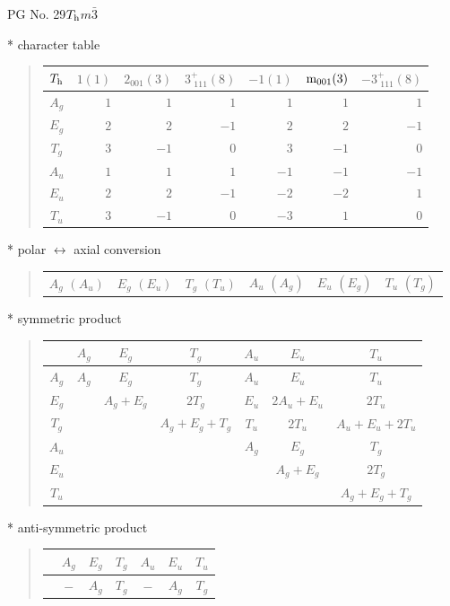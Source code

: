 \documentclass[fleqn,8pt,landscape]{jsarticle}
\begin{document}
\setcounter{MaxMatrixCols}{32}

\renewcommand{\tablename}{Table~}
\renewcommand{\figurename}{Figure~}
\begin{center}
\LARGE
PG No. 29\quad$T_{\rm h}$\quad$m\bar{3}$\quad[ cubic ]
\end{center}

* character table
\begin{quote}
\begin{tabular}{crrrrrr} \hline \hline
$ T_{\rm h} $ & $ 1(1) $ & $ 2{}_{001}(3) $ & $ 3^{+}_{\,\,111}(8) $ & $ -1(1) $ & $ {\rm m}_{001}(3) $ & $ -3^{+}_{\,\,111}(8) $ \\ \hline
$ A_{g} $ & $ 1 $ & $ 1 $ & $ 1 $ & $ 1 $ & $ 1 $ & $ 1 $ \\
$ E_{g} $ & $ 2 $ & $ 2 $ & $ -1 $ & $ 2 $ & $ 2 $ & $ -1 $ \\
$ T_{g} $ & $ 3 $ & $ -1 $ & $ 0 $ & $ 3 $ & $ -1 $ & $ 0 $ \\
$ A_{u} $ & $ 1 $ & $ 1 $ & $ 1 $ & $ -1 $ & $ -1 $ & $ -1 $ \\
$ E_{u} $ & $ 2 $ & $ 2 $ & $ -1 $ & $ -2 $ & $ -2 $ & $ 1 $ \\
$ T_{u} $ & $ 3 $ & $ -1 $ & $ 0 $ & $ -3 $ & $ 1 $ & $ 0 $ \\
 \hline \hline
\end{tabular}
\end{quote}

* polar $\leftrightarrow$ axial conversion
\begin{quote}
\begin{tabular}{cccccc}
$ A_{g}\,\,(A_{u}) $ & $ E_{g}\,\,(E_{u}) $ & $ T_{g}\,\,(T_{u}) $ & $ A_{u}\,\,(A_{g}) $ & $ E_{u}\,\,(E_{g}) $ & $ T_{u}\,\,(T_{g}) $
\end{tabular}
\end{quote}

* symmetric product
\begin{quote}
\begin{tabular}{c|cccccc} \hline \hline
 & $ A_{g} $ & $ E_{g} $ & $ T_{g} $ & $ A_{u} $ & $ E_{u} $ & $ T_{u} $ \\ \hline
$ A_{g} $ & $ A_{g} $ & $ E_{g} $ & $ T_{g} $ & $ A_{u} $ & $ E_{u} $ & $ T_{u} $ \\
$ E_{g} $ & $  $ & $ A_{g} + E_{g} $ & $ 2 T_{g} $ & $ E_{u} $ & $ 2 A_{u} + E_{u} $ & $ 2 T_{u} $ \\
$ T_{g} $ & $  $ & $  $ & $ A_{g} + E_{g} + T_{g} $ & $ T_{u} $ & $ 2 T_{u} $ & $ A_{u} + E_{u} + 2 T_{u} $ \\
$ A_{u} $ & $  $ & $  $ & $  $ & $ A_{g} $ & $ E_{g} $ & $ T_{g} $ \\
$ E_{u} $ & $  $ & $  $ & $  $ & $  $ & $ A_{g} + E_{g} $ & $ 2 T_{g} $ \\
$ T_{u} $ & $  $ & $  $ & $  $ & $  $ & $  $ & $ A_{g} + E_{g} + T_{g} $ \\
 \hline \hline
\end{tabular}
\end{quote}

* anti-symmetric product
\begin{quote}
\begin{tabular}{ccccccc} \hline \hline
 & $ A_{g} $ & $ E_{g} $ & $ T_{g} $ & $ A_{u} $ & $ E_{u} $ & $ T_{u} $ \\ \hline
$  $ & $ - $ & $ A_{g} $ & $ T_{g} $ & $ - $ & $ A_{g} $ & $ T_{g} $ \\
 \hline \hline
\end{tabular}
\end{quote}
\end{document}
